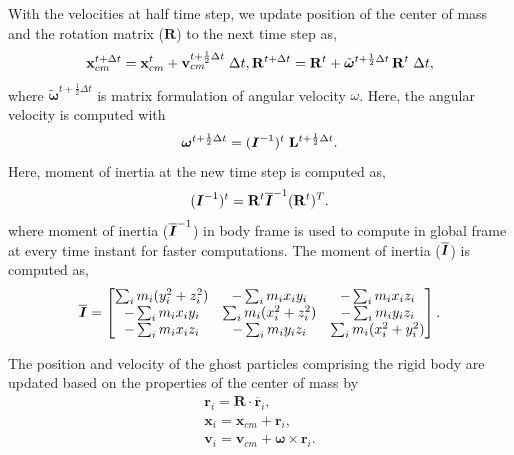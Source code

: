 \documentclass[preprint,12pt]{elsarticle}
\newcommand{\teng}[1]{\ensuremath{\boldsymbol{#1}}}
\newcommand{\ten}[1]{\ensuremath{\mathbf{#1}}}
\begin{document}
With the velocities at half time step, we update position of the center of
mass and the rotation matrix ($\ten{R}$) to the next time step as,
\begin{equation}
  \label{eq:rfc:lin_pos_cm_update}
  \ten{x}_{cm}^{t+\Delta t} = \ten{x}_{cm}^{t} + \ten{v}_{cm}^{t+\frac{1}{2} \Delta t} \; \Delta t,\\
  \ten{R}^{t+ \Delta t} = \ten{R}^{t} + \tilde{\teng{\omega}}^{t+\frac{1}{2} \Delta t} \, \ten{R}^{t} \; \Delta t,
\end{equation}
where $\tilde{\teng{\omega}}^{t+\frac{1}{2} \Delta t}$ is matrix formulation of angular
velocity $\omega$. Here, the angular velocity is computed with
\begin{equation}
  \label{eq:rfc:ang_velocity_update}
  \teng{\omega}^{t+\frac{1}{2} \Delta t} = (\textit{\teng{I}}^{-1})^{t} \; \ten{L}^{t+\frac{1}{2} \Delta t}.
\end{equation}
Here, moment of inertia at the new time step is computed as,
\begin{equation}
  \label{eq:rfc:moi_update}
  (\textit{\teng{I}}^{-1})^{t} = \ten{R}^{t} \textit{\teng{\overline{I}}}^{-1} (\ten{R}^{t})^T.
\end{equation}
where moment of inertia ($\textit{\teng{\overline{I}}}^{-1}$) in body frame is
used to compute in global frame at every time instant for faster computations.
The moment of inertia ($\textit{\teng{\overline{I}}}$) is computed as,
\begin{equation*}
\textit{\teng{\overline{I}}} =
\begin{bmatrix}
\sum_i m_i (y_i^2 + z_i^2) & -\sum_i m_i x_iy_i & -\sum_i m_i x_iz_i\\
-\sum_i m_i x_iy_i & \sum_i m_i (x_i^2 + z_i^2) &  -\sum_i m_i y_iz_i\\
-\sum_i m_i  x_iz_i & -\sum_i m_i y_iz_i & \sum_i m_i (x_i^2 + y_i^2)
\end{bmatrix}.
\end{equation*}

The position and velocity of the ghost particles comprising the rigid body are
updated based on the properties of the center of mass by
\begin{eqnarray}
  \label{eq:rfc:rb_particle_pos_update}
  \ten{r}_i = \ten{R} \cdot \overline{\ten{r}}_{i},\\
  \ten{x}_i = \ten{x}_{cm} + \ten{r}_{i},\\
  \ten{v}_i = \ten{v}_{cm} + \teng{\omega} \times \ten{r}_{i}.
\end{eqnarray}
\end{document}
